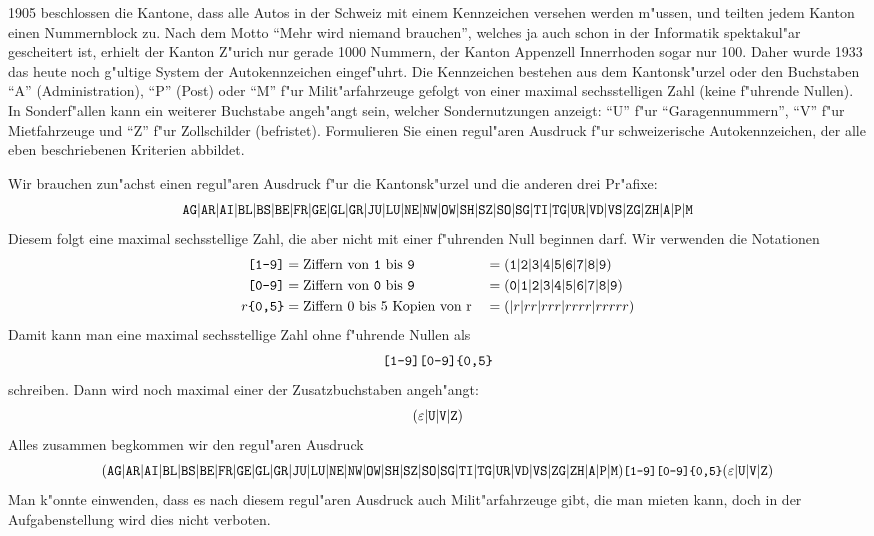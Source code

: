 1905 beschlossen die Kantone, dass alle Autos in der Schweiz mit einem
Kennzeichen versehen werden m"ussen, und teilten jedem Kanton einen
Nummernblock zu. Nach dem Motto ``Mehr wird niemand brauchen'', welches
ja auch schon in der Informatik spektakul"ar gescheitert ist, erhielt
der Kanton Z"urich nur gerade 1000 Nummern, der
Kanton Appenzell Innerrhoden sogar nur 100.
Daher wurde 1933 das heute noch g"ultige System der Autokennzeichen
eingef"uhrt. Die Kennzeichen bestehen aus dem Kantonsk"urzel
oder den Buchstaben ``A'' (Administration), ``P'' (Post) oder
``M'' f"ur Milit"arfahrzeuge gefolgt von einer maximal sechsstelligen Zahl
(keine f"uhrende Nullen).
In Sonderf"allen kann ein weiterer Buchstabe angeh"angt sein, welcher
Sondernutzungen anzeigt: ``U'' f"ur ``Garagennummern'',
``V'' f"ur Mietfahrzeuge und ``Z'' f"ur Zollschilder (befristet).
Formulieren Sie einen regul"aren Ausdruck f"ur schweizerische Autokennzeichen,
der alle eben beschriebenen Kriterien abbildet.

\begin{loesung}
Wir brauchen zun"achst einen regul"aren Ausdruck f"ur die Kantonsk"urzel
und die anderen drei Pr"afixe:
\[
{\tt AG}|
{\tt AR}|
{\tt AI}|
{\tt BL}|
{\tt BS}|
{\tt BE}|
{\tt FR}|
{\tt GE}|
{\tt GL}|
{\tt GR}|
{\tt JU}|
{\tt LU}|
{\tt NE}|
{\tt NW}|
{\tt OW}|
{\tt SH}|
{\tt SZ}|
{\tt SO}|
{\tt SG}|
{\tt TI}|
{\tt TG}|
{\tt UR}|
{\tt VD}|
{\tt VS}|
{\tt ZG}|
{\tt ZH}|
{\tt A}|
{\tt P}|
{\tt M}
\]
Diesem folgt eine maximal sechsstellige Zahl, die aber nicht mit einer
f"uhrenden Null beginnen darf. Wir verwenden die Notationen
\begin{align*}
\text{\tt [1-9]}&=\text{Ziffern von {\tt 1} bis {\tt 9}}
&&=
({\tt 1}|
{\tt 2}|
{\tt 3}|
{\tt 4}|
{\tt 5}|
{\tt 6}|
{\tt 7}|
{\tt 8}|
{\tt 9})
\\
\text{\tt [0-9]}&=\text{Ziffern von {\tt 0} bis {\tt 9}}
&&=
({\tt 0}|
{\tt 1}|
{\tt 2}|
{\tt 3}|
{\tt 4}|
{\tt 5}|
{\tt 6}|
{\tt 7}|
{\tt 8}|
{\tt 9})
\\
r{\text{\tt \{0,5\}}}&=\text{Ziffern 0 bis 5 Kopien von r}
&&=(|r|rr|rrr|rrrr|rrrrr)
\end{align*}
Damit kann man eine maximal sechsstellige Zahl ohne f"uhrende Nullen als
\[
\text{\tt [1-9][0-9]\{0,5\}}
\]
schreiben.
Dann wird noch maximal einer der Zusatzbuchstaben angeh"angt:
\[
(\varepsilon|{\tt U}|{\tt V}|{\tt Z})
\]
Alles zusammen begkommen wir den regul"aren Ausdruck
\[
\small
(
{\tt AG}|
{\tt AR}|
{\tt AI}|
{\tt BL}|
{\tt BS}|
{\tt BE}|
{\tt FR}|
{\tt GE}|
{\tt GL}|
{\tt GR}|
{\tt JU}|
{\tt LU}|
{\tt NE}|
{\tt NW}|
{\tt OW}|
{\tt SH}|
{\tt SZ}|
{\tt SO}|
{\tt SG}|
{\tt TI}|
{\tt TG}|
{\tt UR}|
{\tt VD}|
{\tt VS}|
{\tt ZG}|
{\tt ZH}|
{\tt A}|
{\tt P}|
{\tt M})
\text{\tt [1-9][0-9]\{0,5\}}
(\varepsilon|{\tt U}|{\tt V}|{\tt Z})
\]
Man k"onnte einwenden, dass es nach diesem regul"aren Ausdruck auch
Milit"arfahrzeuge gibt, die man mieten kann, doch in der Aufgabenstellung
wird dies nicht verboten.
\end{loesung}

